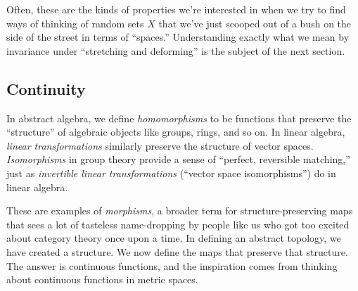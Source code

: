 \documentclass{fkpaper}
\begin{document}
\begin{multicols}{2}
  Often, these are the kinds of properties we're interested in when we
  try to find ways of thinking of {\color{red} random sets $X$ that
    we've just scooped out of a bush on the side of the street in
    terms of ``spaces.''} Understanding exactly what we mean by
  invariance under ``stretching and deforming'' is the subject of the
  next section.


  \subsection{Continuity}
  In abstract algebra, we define \emph{homomorphisms} to be functions
  that preserve the ``structure'' of algebraic objects like groups,
  rings, and so on. In linear algebra, \emph{linear transformations}
  similarly preserve the structure of vector spaces.
  \emph{Isomorphisms} in group theory provide a sense of ``perfect,
  reversible matching,'' just as \emph{invertible linear
    transformations} (``vector space isomorphisms'') do in linear
  algebra.

  These are examples of \emph{morphisms}, a broader term for
  structure-preserving maps {\color{red} that sees a lot of tasteless
    name-dropping by people like us who got too excited about category
    theory once upon a time.} In defining an abstract topology, we
  have created a structure. We now define the maps that preserve that
  structure. The answer is continuous functions, and the inspiration
  comes from thinking about continuous functions in metric spaces.


\end{multicols}
\end{document}
